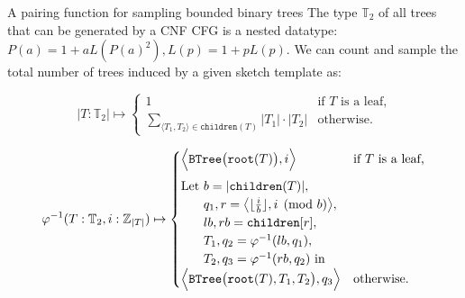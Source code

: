 \documentclass{beamer}
\begin{document}
\begin{frame}[fragile]{A pairing function for sampling bounded binary trees}
The type $\mathbb{T}_2$ of all trees that can be generated by a CNF CFG is a nested datatype: $P(a) = 1 + a L(P(a)^2), L(p) = 1 + p L(p)$. We can count and sample the total number of trees induced by a given sketch template as:

\begin{equation*}
|T: \mathbb{T}_2| \mapsto \begin{cases}
1  & \text{if $T$ is a leaf,} \\
\sum_{\langle T_1, T_2\rangle \in \texttt{children}(T)} |T_1| \cdot |T_2| & \text{otherwise.}
\end{cases}
\end{equation*}

\begin{equation*}
\varphi^{-1}(T: \mathbb{T}_2, i: \mathbb{Z}_{|T|}) \mapsto \begin{cases}
\Big\langle\texttt{BTree}\big(\texttt{root}(T)\big), i\Big\rangle & \text{if $T$ is a leaf,} \vspace{5pt}\\
\text{Let } b = |\texttt{children}(T)|,\\
\phantom{\text{Let }} q_1, r=\big\langle\lfloor\frac{i}{b}\rfloor, i \pmod{b}\big\rangle,\\
\phantom{\text{Let }} lb, rb = \texttt{children}[r],\\
\phantom{\text{Let }} T_1, q_2 = \varphi^{-1}(lb, q_1),\\
\phantom{\text{Let }} T_2, q_3 = \varphi^{-1}(rb, q_2) \text{ in } \\
\Big\langle\texttt{BTree}\big(\texttt{root}(T), T_1, T_2\big), q_3\Big\rangle & \text{otherwise.} \\
\end{cases}
\end{equation*}
\end{frame}
\end{document}
